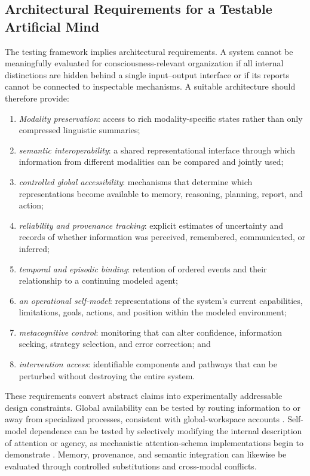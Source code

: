 \subsection{Architectural Requirements for a Testable Artificial Mind}

The testing framework implies architectural requirements. A system cannot be meaningfully evaluated for consciousness-relevant organization if all internal distinctions are hidden behind a single input--output interface or if its reports cannot be connected to inspectable mechanisms. A suitable architecture should therefore provide:

\begin{enumerate}
    \item \emph{Modality preservation}: access to rich modality-specific states rather than only compressed linguistic summaries;
    \item \emph{semantic interoperability}: a shared representational interface through which information from different modalities can be compared and jointly used;
    \item \emph{controlled global accessibility}: mechanisms that determine which representations become available to memory, reasoning, planning, report, and action;
    \item \emph{reliability and provenance tracking}: explicit estimates of uncertainty and records of whether information was perceived, remembered, communicated, or inferred;
    \item \emph{temporal and episodic binding}: retention of ordered events and their relationship to a continuing modeled agent;
    \item \emph{an operational self-model}: representations of the system's current capabilities, limitations, goals, actions, and position within the modeled environment;
    \item \emph{metacognitive control}: monitoring that can alter confidence, information seeking, strategy selection, and error correction; and
    \item \emph{intervention access}: identifiable components and pathways that can be perturbed without destroying the entire system.
\end{enumerate}

These requirements convert abstract claims into experimentally addressable design constraints. Global availability can be tested by routing information to or away from specialized processes, consistent with global-workspace accounts \cite{baars1988cognitive,dehaene2011experimental,mashour2020conscious}. Self-model dependence can be tested by selectively modifying the internal description of attention or agency, as mechanistic attention-schema implementations begin to demonstrate \cite{graziano2015attention,wilterson2021attention}. Memory, provenance, and semantic integration can likewise be evaluated through controlled substitutions and cross-modal conflicts.

